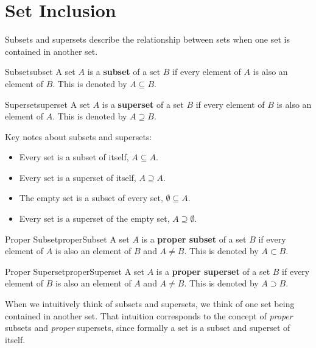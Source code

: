 \section{Set Inclusion}
Subsets and supersets describe the relationship between sets when one set is contained in 
another set.

\begin{definition}{Subset}{subset}
  A set \( A \) is a \textbf{subset} of a set \( B \) if every element of 
  \( A \) is also an element of \( B \).  This is denoted by \( A \subseteq B \).
\end{definition}

\begin{definition}
    {Superset}{superset}
    A set \( A \) is a \textbf{superset} of a set \( B \) if every element of 
    \( B \) is also an element of \( A \). This is denoted by \( A \supseteq B \).
\end{definition}

Key notes about subsets and supersets:
\begin{itemize}
  \item Every set is a subset of itself, \( A \subseteq A \).
  \item Every set is a superset of itself, \( A \supseteq A \).
  \item The empty set is a subset of every set, \( \emptyset \subseteq A \).
  \item Every set is a superset of the empty set, \( A \supseteq \emptyset \).
\end{itemize}
  

\begin{definition}{Proper Subset}{properSubset}
  A set \( A \) is a \textbf{proper subset} of a set \( B \) if every element of 
  \( A \) is also an element of \( B \) and \( A \neq B \). This is denoted by 
  \( A \subset B \).
\end{definition}

\begin{definition}
    {Proper Superset}{properSuperset}
    A set \( A \) is a \textbf{proper superset} of a set \( B \) if every element of 
    \( B \) is also an element of \( A \) and \( A \neq B \). This is denoted by 
    \( A \supset B \).
\end{definition}

When we intuitively think of subsets and supersets, we think of one set being
contained in another set. That intuition corresponds to the concept of \emph{proper}
subsets and \emph{proper} supersets, since formally a set is a subset and
superset of itself.

